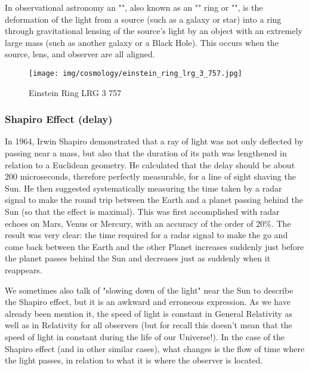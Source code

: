 	In observational astronomy an "", also known as an "" ring or "", is the deformation of the light from a source (such as a galaxy or star) into a ring through gravitational lensing of the source's light by an object with an extremely large mass (such as another galaxy or a Black Hole). This occurs when the source, lens, and observer are all aligned.
	\begin{figure}[H]
		\centering
		\texttt{[image: img/cosmology/einstein\_ring\_lrg\_3\_757.jpg]}	
		\caption{Einstein Ring LRG 3 757}
	\end{figure}
	
	\subsubsection{Shapiro Effect (delay)}
	In 1964,  Irwin Shapiro demonstrated that a ray of light was not only deflected by passing near a mass, but also that the duration of its path was lengthened in relation to a Euclidean geometry. He calculated that the delay should be about $200$ microseconds, therefore perfectly measurable, for a line of sight shaving the Sun. He then suggested systematically measuring the time taken by a radar signal to make the round trip between the Earth and a planet passing behind the Sun (so that the effect is maximal). This was first accomplished with radar echoes on Mars, Venus or Mercury, with an accuracy of the order of $20\%$. The result was very clear: the time required for a radar signal to make the go and come back between the Earth and the other Planet increases suddenly just before the planet passes behind the Sun and decreases just as suddenly when it reappears.
	\begin{tcolorbox}[title=Remark,colframe=black,arc=10pt]
	We sometimes also talk of "slowing down of the light" near the Sun to describe the Shapiro effect, but it is an awkward and erroneous expression. As we have already been mention it, the speed of light is constant in General Relativity as well as in Relativity for all observers (but for recall this doesn't mean that the speed of light in constant during the life of our Universe!). In the case of the Shapiro effect (and in other similar cases), what changes is the flow of time where the light passes, in relation to what it is where the observer is located.
	\end{tcolorbox}
